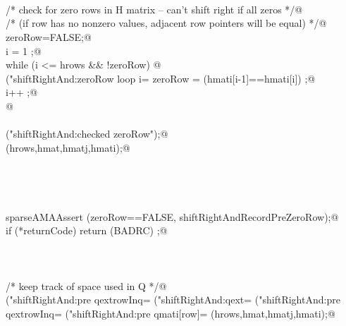 \documentclass[12pt]{article}
\begin{document}
\begin{flushleft}
\begin{minipage}{\linewidth}
\begin{list}{}{}
\mbox{}\verb@@\\
\mbox{}\verb@@\\
\mbox{}\verb@@\\
\mbox{}\verb@        /* check for zero rows in H matrix -- can't shift right if all zeros */@\\
\mbox{}\verb@        /* (if row has no nonzero values, adjacent row pointers will be equal) */@\\
\mbox{}\verb@        zeroRow=FALSE;@\\
\mbox{}\verb@        i = 1 ;@\\
\mbox{}\verb@        while (i <= hrows && !zeroRow) {@\\
\mbox{}\verb@printf("shiftRightAnd:zeroRow loop i=%u,hrows=%u\n",i,hrows);fflush(stdout);@\\
\mbox{}\verb@                zeroRow = (hmati[i-1]==hmati[i]) ;@\\
\mbox{}\verb@                i++ ;@\\
\mbox{}\verb@        }@\\
\mbox{}\verb@@\\
\mbox{}\verb@printf("shiftRightAnd:checked zeroRow\n");@\\
\mbox{}\verb@cPrintSparse(hrows,hmat,hmatj,hmati);@\\
\mbox{}\verb@@\\
\mbox{}\verb@@\\
\mbox{}\verb@@\\
\mbox{}\verb@@\\
\mbox{}\verb@    sparseAMAAssert (zeroRow==FALSE, shiftRightAndRecordPreZeroRow);@\\
\mbox{}\verb@        if (*returnCode) return (BADRC) ;@\\
\mbox{}\verb@@\\
\mbox{}\verb@@\\
\mbox{}\verb@@\\
\mbox{}\verb@        /* keep track of space used in Q */@\\
\mbox{}\verb@printf("shiftRightAnd:pre qextrowInq=%u\n",rowsInQ);fflush(stdout);@\\
\mbox{}\verb@printf("shiftRightAnd:qext=%u\n",qextent);fflush(stdout);@\\
\mbox{}\verb@printf("shiftRightAnd:pre qextrowInq=%u\n",qmati[0]);fflush(stdout);@\\
\mbox{}\verb@printf("shiftRightAnd:pre qmati[row]=%u\n",qmati[rowsInQ]);fflush(stdout);@\\
\mbox{}\verb@cPrintSparse(hrows,hmat,hmatj,hmati);@\\

\end{list}
\end{minipage}
\end{flushleft}
\end{document}

